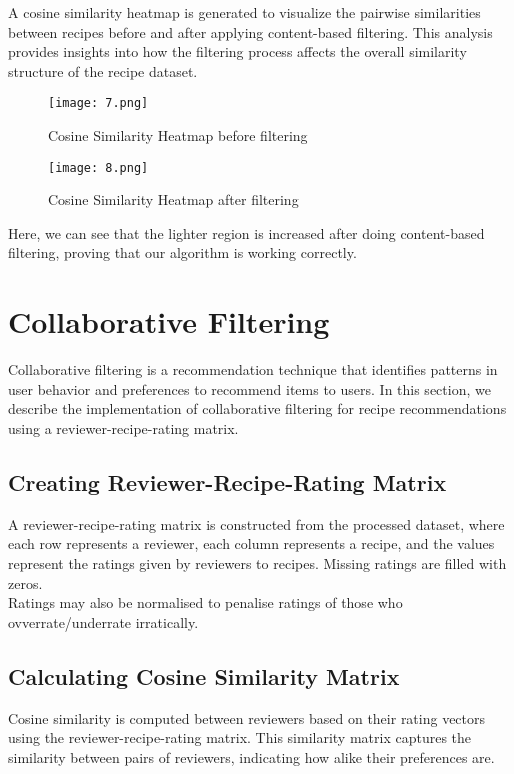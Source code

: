 \documentclass[conference]{IEEEtran}
\begin{document}
A cosine similarity heatmap is generated to visualize the pairwise similarities between recipes before and after applying content-based filtering. This analysis provides insights into how the filtering process affects the overall similarity structure of the recipe dataset.

\begin{figure}[H]
\centering
\texttt{[image: 7.png]}
\caption{Cosine Similarity Heatmap before filtering}
\label{fig:monthly_publication}
\end{figure}

\begin{figure}[H]
\centering
\texttt{[image: 8.png]}
\caption{Cosine Similarity Heatmap after filtering}
\label{fig:monthly_publication}
\end{figure}

Here, we can see that the lighter region is increased after doing content-based filtering, proving that our algorithm is working correctly.

\section{Collaborative Filtering}

Collaborative filtering is a recommendation technique that identifies patterns in user behavior and preferences to recommend items to users. In this section, we describe the implementation of collaborative filtering for recipe recommendations using a reviewer-recipe-rating matrix.

\subsection{Creating Reviewer-Recipe-Rating Matrix}

A reviewer-recipe-rating matrix is constructed from the processed dataset, where each row represents a reviewer, each column represents a recipe, and the values represent the ratings given by reviewers to recipes. Missing ratings are filled with zeros.\\
Ratings may also be normalised to penalise ratings of those who ovverrate/underrate irratically.

\subsection{Calculating Cosine Similarity Matrix}

Cosine similarity is computed between reviewers based on their rating vectors using the reviewer-recipe-rating matrix. This similarity matrix captures the similarity between pairs of reviewers, indicating how alike their preferences are.
\end{document}
